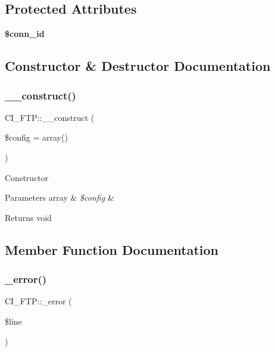 \subsection*{Protected Attributes}
\begin{DoxyCompactItemize}
\item 
\mbox{\label{class_c_i___f_t_p_a1d0cef6c0a50be1cbb07f88b5352fd2f}} 
{\bfseries \$conn\+\_\+id}
\end{DoxyCompactItemize}


\subsection{Constructor \& Destructor Documentation}
\mbox{\label{class_c_i___f_t_p_ab44e5032e8ed6ffdb5b638e03bca9bab}} 
\subsubsection{\texorpdfstring{\+\_\+\+\_\+construct()}{\_\_construct()}}
{\footnotesize\ttfamily C\+I\+\_\+\+F\+T\+P\+::\+\_\+\+\_\+construct (\begin{DoxyParamCaption}\item[{}]{\$config = {\ttfamily array()} }\end{DoxyParamCaption})}

Constructor


\begin{DoxyParams}[1]{Parameters}
array & {\em \$config} & \\
\hline
\end{DoxyParams}
\begin{DoxyReturn}{Returns}
void 
\end{DoxyReturn}


\subsection{Member Function Documentation}
\mbox{\label{class_c_i___f_t_p_aff22e8ded1e2061f7674e9f183771b4d}} 
\subsubsection{\texorpdfstring{\+\_\+error()}{\_error()}}
{\footnotesize\ttfamily C\+I\+\_\+\+F\+T\+P\+::\+\_\+error (\begin{DoxyParamCaption}\item[{}]{\$line }\end{DoxyParamCaption})\hspace{0.3cm}{\ttfamily [protected]}}

